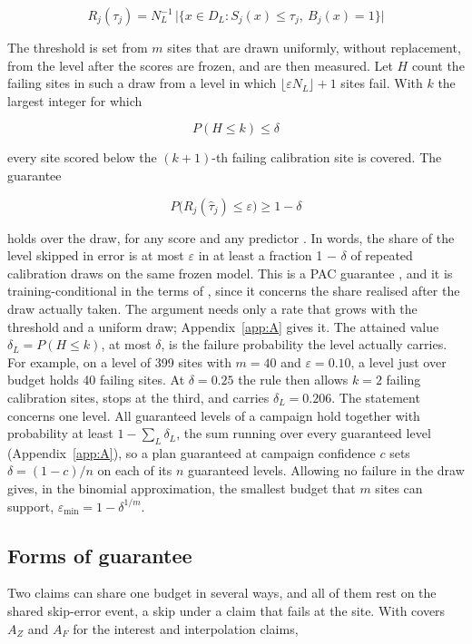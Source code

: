 \documentclass{iopjournal}
\begin{document}
\[
R_j(\tau_j) = N_L^{-1} \, \lvert \{x \in D_L : S_j(x) \le \tau_j,\ B_j(x) = 1\} \rvert
\]

The threshold is set from \(m\) sites that are drawn uniformly, without replacement, from the level after the scores are frozen, and are then measured. Let \(H\) count the failing sites in such a draw from a level in which \(\lfloor \varepsilon N_L \rfloor + 1\) sites fail. With \(k\) the largest integer for which

\[
P(H \le k) \le \delta
\]

every site scored below the \((k+1)\)-th failing calibration site is covered. The guarantee

\[
P\big(R_j(\hat\tau_j) \le \varepsilon\big) \ge 1 - \delta
\]

holds over the draw, for any score and any predictor \cite{Wilks1941,Bates2021,Angelopoulos2025}. In words, the share of the level skipped in error is at most \ensuremath{\varepsilon} in at least a fraction 1 \ensuremath{-} \ensuremath{\delta} of repeated calibration draws on the same frozen model. This is a PAC guarantee \cite{Valiant1984,Park2020}, and it is training-conditional in the terms of \cite{VovkCond2013}, since it concerns the share realised after the draw actually taken. The argument needs only a rate that grows with the threshold and a uniform draw; Appendix~\ref{app:A} gives it. The attained value \(\delta_L = P(H \le k)\), at most \(\delta\), is the failure probability the level actually carries. For example, on a level of 399 sites with \(m = 40\) and \(\varepsilon = 0.10\), a level just over budget holds 40 failing sites. At \(\delta = 0.25\) the rule then allows \(k = 2\) failing calibration sites, stops at the third, and carries \(\delta_L = 0.206\). The statement concerns one level. All guaranteed levels of a campaign hold together with probability at least \(1 - \sum_L \delta_L\), the sum running over every guaranteed level (Appendix~\ref{app:A}), so a plan guaranteed at campaign confidence \(c\) sets \(\delta = (1 - c)/n\) on each of its \(n\) guaranteed levels. Allowing no failure in the draw gives, in the binomial approximation, the smallest budget that \(m\) sites can support, \(\varepsilon_{\min} = 1 - \delta^{1/m}\).

\hypertarget{sec:3-4}{%
\subsection{Forms of guarantee}\label{sec:3-4}}

Two claims can share one budget in several ways, and all of them rest on the shared skip-error event, a skip under a claim that fails at the site. With covers \(A_Z\) and \(A_F\) for the interest and interpolation claims,
\end{document}
